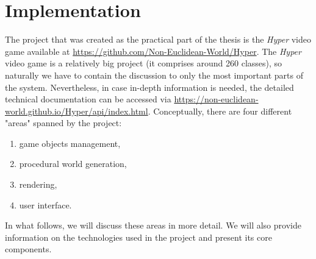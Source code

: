 \chapter{Implementation} \label{ch:implementation}
The project that was created as the practical part of the thesis is the \textit{Hyper} video game available at \url{https://github.com/Non-Euclidean-World/Hyper}.
The \textit{Hyper} video game is a relatively big project (it comprises around 260 classes), so naturally we have to contain the discussion to only the most important parts of the system.
Nevertheless, in case in-depth information is needed, the detailed technical documentation can be accessed via \url{https://non-euclidean-world.github.io/Hyper/api/index.html}.
Conceptually, there are four different "areas" spanned by the project:
\begin{enumerate}
  \item game objects management,
  \item procedural world generation,
  \item rendering,
  \item user interface.
\end{enumerate}

In what follows, we will discuss these areas in more detail.
We will also provide information on the technologies used in the project and present its core components.






